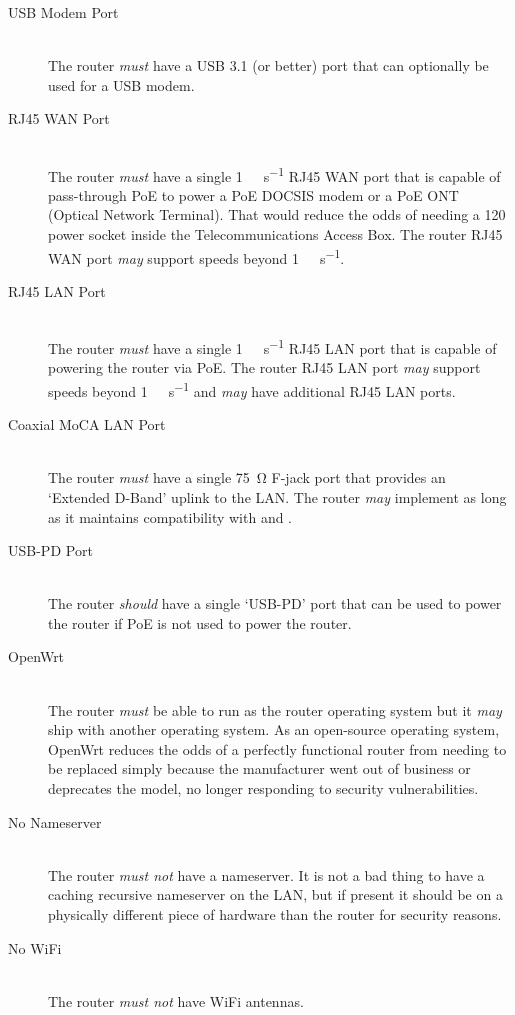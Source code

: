 \begin{description}
  \item[USB Modem Port] \hfill \\ The router \emph{must} have a USB 3.1 (or better) port that can optionally
       be used for a USB modem.
  \item[RJ45 WAN Port] \hfill \\ The router \emph{must} have a single \SI{1}{\giga\bit\per\second} RJ45 WAN port
       that is capable of pass-through PoE to power a PoE DOCSIS modem or a PoE ONT (Optical Network Terminal).
       That would reduce the odds of needing a \SI{120}{\vrms} power socket inside the Telecommunications Access
       Box. The router RJ45 WAN port \emph{may} support speeds beyond \SI{1}{\giga\bit\per\second}.
  \item[RJ45 LAN Port] \hfill \\ The router \emph{must} have a single \SI{1}{\giga\bit\per\second} RJ45 LAN port
       that is capable of powering the router via PoE. The router RJ45 LAN port \emph{may} support speeds beyond
       \SI{1}{\giga\bit\per\second} and \emph{may} have additional RJ45 LAN ports.
  \item[Coaxial MoCA LAN Port] \hfill \\ The router \emph{must} have a single \SI{75}{\ohm} F-jack port that
       provides an `Extended D-Band'  uplink to the LAN. The router \emph{may} implement 
       as long as it maintains compatibility with  and .
  \item[USB-PD Port] \hfill \\ The router \emph{should} have a single `USB-PD' port that can be used to power the
       router if PoE is not used to power the router.
  \item[OpenWrt] \hfill \\ The router \emph{must} be able to run  as the router
       operating system but it \emph{may} ship with another operating system. As an open-source operating system,
       OpenWrt reduces the odds of a perfectly functional router from needing to be replaced simply because the
       manufacturer went out of business or deprecates the model, no longer responding to security vulnerabilities.
  \item[No Nameserver] \hfill \\ The router \emph{must not} have a nameserver. It is not a bad thing to have a
       caching recursive nameserver on the LAN, but if present it should be on a physically different piece of
       hardware than the router for security reasons.
  \item[No WiFi] \hfill \\ The router \emph{must not} have WiFi antennas.
\end{description}

